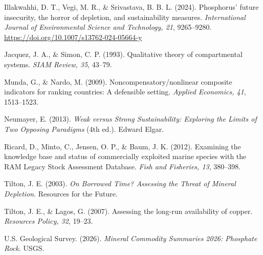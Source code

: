 \documentclass[11pt]{article}
\begin{document}
\begin{list}{}{%
\setlength{\leftmargin}{1.5em}%
\setlength{\itemindent}{-1.5em}%
\setlength{\itemsep}{4pt}%
\setlength{\parsep}{0pt}%
\setlength{\topsep}{0pt}}
\item Illakwahhi, D. T., Vegi, M. R., \& Srivastava, B. B. L. (2024). Phosphorus' future insecurity, the horror of depletion, and sustainability measures. \emph{International Journal of Environmental Science and Technology, 21}, 9265--9280. \url{https://doi.org/10.1007/s13762-024-05664-y}
\item Jacquez, J. A., \& Simon, C. P. (1993). Qualitative theory of compartmental systems. \emph{SIAM Review, 35}, 43--79.
\item Munda, G., \& Nardo, M. (2009). Noncompensatory/nonlinear composite indicators for ranking countries: A defensible setting. \emph{Applied Economics, 41}, 1513--1523.
\item Neumayer, E. (2013). \emph{Weak versus Strong Sustainability: Exploring the Limits of Two Opposing Paradigms} (4th ed.). Edward Elgar.
\item Ricard, D., Minto, C., Jensen, O. P., \& Baum, J. K. (2012). Examining the knowledge base and status of commercially exploited marine species with the RAM Legacy Stock Assessment Database. \emph{Fish and Fisheries, 13}, 380--398.
\item Tilton, J. E. (2003). \emph{On Borrowed Time? Assessing the Threat of Mineral Depletion}. Resources for the Future.
\item Tilton, J. E., \& Lagos, G. (2007). Assessing the long-run availability of copper. \emph{Resources Policy, 32}, 19--23.
\item U.S. Geological Survey. (2026). \emph{Mineral Commodity Summaries 2026: Phosphate Rock}. USGS.
\end{list}
\end{document}
